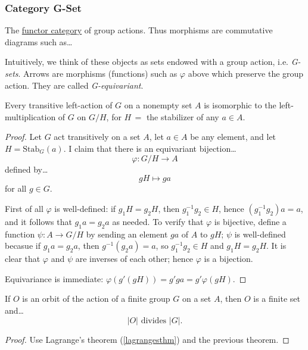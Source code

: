 \subsubsection{Category G-Set}\label{gsetcategory}
The \hyperref[functorcategories]{functor category} of group actions. Thus morphisms are commutative diagrams such as\dots

\begin{figure}[H]
\centering

\end{figure}

\noindent Intuitively, we think of these objects as sets endowed with a group action, i.e. \emph{G-sets}. Arrows are morphisms (functions) such as $\varphi$
above which preserve the group action. They are called \emph{G-equivariant}.

\begin{proposition}
\label{characterizationofactions}
Every transitive left-action of $G$ on a nonempty set $A$ is isomorphic to the left-multiplication of $G$ on $G/H$, for $H \, =$ the stabilizer
of any $a \in A$.
\end{proposition}

\begin{proof}
Let $G$ act transitively on a set $A$, let $a \in A$ be any element, and let $H = \textrm{Stab}_G(a)$. I claim that there is an equivariant bijection\dots
$$\varphi : G/H \rightarrow A$$
defined by\dots
$$gH \mapsto ga$$
for all $g \in G$.

First of all $\varphi$ is well-defined: if $g_1H =g_2H$, then $g_1^{-1}g_2 \in H$, hence $(g_1^{-1}g_2)a = a$, and it follows that $g_1a = g_2a$ as needed.
To verify that $\varphi$ is bijective, define a function $\psi : A \rightarrow G/H$ by sending an element $ga$ of $A$ to $gH$; $\psi$ is well-defined becasue if $g_1a = g_2a$,
then $g^{-1}(g_2a) = a$, so $g_1^{-1}g_2 \in H$ and $g_1H = g_2H$. It is clear that $\varphi$ and $\psi$ are inverses of each other; hence $\varphi$ is a bijection.

Equivariance is immediate: $\varphi(g'(gH)) = g'ga = g' \varphi(gH).$
\end{proof}

\begin{corollary}
\label{lagrangeforactions}
If $O$ is an orbit of the action of a finite group $G$ on a set $A$, then $O$ is a finite set and\dots
$$|O| \textrm{ divides } |G|.$$
\end{corollary}

\begin{proof}
Use Lagrange's theorem (\ref{lagrangesthm}) and the previous theorem.
\end{proof}

